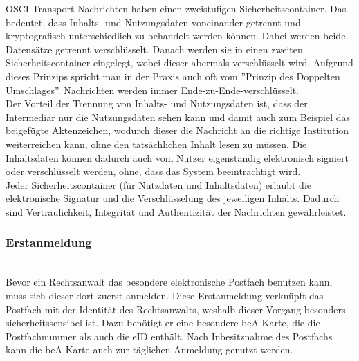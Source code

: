 OSCI-Transport-Nachrichten haben einen zweistufigen Sicherheitscontainer. Das bedeutet, dass Inhalts- und Nutzungsdaten voneinander getrennt und kryptografisch unterschiedlich zu behandelt werden können. Dabei werden beide Datensätze getrennt verschlüsselt. Danach werden sie in einen zweiten Sicherheitscontainer eingelegt, wobei dieser abermals verschlüsselt wird. Aufgrund dieses Prinzips spricht man in der Praxis auch oft vom ''Prinzip des Doppelten Umschlages''. Nachrichten werden immer Ende-zu-Ende-verschlüsselt. \\
Der Vorteil der Trennung von Inhalts- und Nutzungsdaten ist, dass der Intermediär nur die Nutzungsdaten sehen kann und damit auch zum Beispiel das beigefügte Aktenzeichen, wodurch dieser die Nachricht an die richtige Institution weiterreichen kann, ohne den tatsächlichen Inhalt lesen zu müssen. Die Inhaltsdaten können dadurch auch vom Nutzer eigenständig elektronisch signiert oder verschlüsselt werden, ohne, dass das System beeinträchtigt wird. \\
Jeder Sicherheitscontainer (für Nutzdaten und Inhaltsdaten) erlaubt die elektronische Signatur und die Verschlüsselung des jeweiligen Inhalts. Dadurch sind Vertraulichkeit, Integrität und Authentizität der Nachrichten gewährleistet. \cite{bea:osci}

\subsubsection{Erstanmeldung}\hspace*{\fill} \\
Bevor ein Rechtsanwalt das besondere elektronische Postfach benutzen kann, muss sich dieser dort zuerst anmelden. Diese Erstanmeldung verknüpft das Postfach mit der Identität des Rechtsanwalts, weshalb dieser Vorgang besonders sicherheitssensibel ist. Dazu benötigt er eine besondere beA-Karte, die die Postfachnummer als auch die eID enthält. Nach Inbesitznahme des Postfachs kann die beA-Karte auch zur täglichen Anmeldung genutzt werden.


